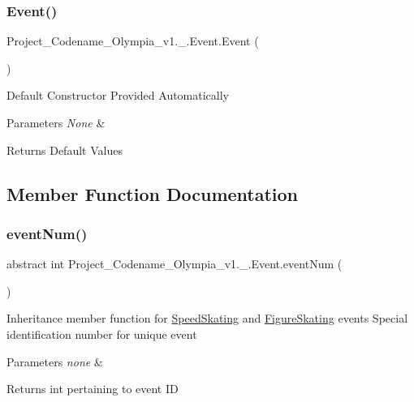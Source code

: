 \subsubsection{\texorpdfstring{Event()}{Event()}}
{\footnotesize\ttfamily Project\+\_\+\+Codename\+\_\+\+Olympia\+\_\+v1.\+\_.\+Event.\+Event (\begin{DoxyParamCaption}{ }\end{DoxyParamCaption})\hspace{0.3cm}{\ttfamily [inline]}}

Default Constructor Provided Automatically 
\begin{DoxyParams}{Parameters}
{\em None} & \\
\hline
\end{DoxyParams}
\begin{DoxyReturn}{Returns}
Default Values 
\end{DoxyReturn}


\subsection{Member Function Documentation}
\mbox{\label{classProject__Codename__Olympia__v1_1_1__0_1_1Event_ad1154ef4dd1dec29d8ebf5614d84b1f3}} 
\subsubsection{\texorpdfstring{event\+Num()}{eventNum()}}
{\footnotesize\ttfamily abstract int Project\+\_\+\+Codename\+\_\+\+Olympia\+\_\+v1.\+\_.\+Event.\+event\+Num (\begin{DoxyParamCaption}{ }\end{DoxyParamCaption})\hspace{0.3cm}{\ttfamily [pure virtual]}}

Inheritance member function for \hyperlink{classProject__Codename__Olympia__v1_1_1__0_1_1SpeedSkating}{Speed\+Skating} and \hyperlink{classProject__Codename__Olympia__v1_1_1__0_1_1FigureSkating}{Figure\+Skating} events Special identification number for unique event 
\begin{DoxyParams}{Parameters}
{\em none} & \\
\hline
\end{DoxyParams}
\begin{DoxyReturn}{Returns}
int pertaining to event ID 
\end{DoxyReturn}


